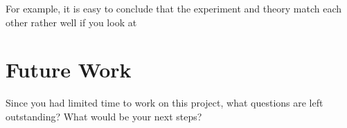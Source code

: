\documentclass[letterpaper,12pt]{article}
\numberwithin{equation}{section}
\begin{document}
For example, it is easy to conclude that the
experiment and theory match each other rather well if you look at


\section{Future Work}
Since you had limited time to work on this project, what questions are left outstanding? What would be your next steps? 




\end{document}
